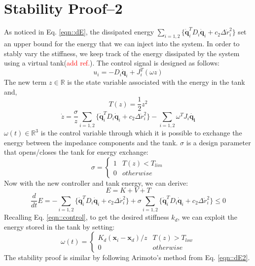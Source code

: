 \documentclass[]{article}
\begin{document}
\section{Stability Proof--2}
As noticed in Eq. \ref{eqn::dE}, the dissipated energy $\sum\limits_{i=1,2}\{\mathbf{\dot{q}}_i^TD_i\mathbf{\dot{q}}_i+c_2\Delta \dot{r}_i^2\}$ set an upper bound for the energy that we can inject into the system. In order to stably vary the stiffness, we keep track of the energy dissipated by the system using a virtual tank(\textcolor{red}{add ref.}). The control signal is designed as follows:
\begin{equation}
u_i=-D_i\mathbf{\dot{q}}_i+J_i^T(\omega z)
\label{eqn::new_control}
\end{equation} 
The new term $z\in \mathbb{R}$ is the state variable associated with the energy in the tank and,
\begin{equation}
T(z)=\frac{1}{2}z^2
\end{equation}
\begin{equation}
\dot{z}=\frac{\sigma}{z}\sum\limits_{i=1,2}\{\mathbf{\dot{q}}_i^TD_i\mathbf{\dot{q}}_i+c_2\Delta \dot{r}_i^2\}-\sum\limits_{i=1,2}\omega^T J_i\mathbf{\dot{q_i}}
\end{equation}
$\omega(t)\in \mathbb{R}^3$ is the control variable through which it is possible to exchange the energy between the impedance components and the tank. $\sigma$ is a design parameter that opens/closes the tank for energy exchange:
\begin{displaymath}
\sigma = \left\{\begin{array}{ll}
1& T(z)<T_{lim}\\
0& otherwise
\end{array}\right.
\end{displaymath}
Now with the new controller and tank energy, we can derive:
\begin{equation}
E=K+V+T
\end{equation}
\begin{equation}
\frac{d}{dt}E=-\sum\limits_{i=1,2}\{\mathbf{\dot{q}}_i^TD_i\mathbf{\dot{q}}_i+c_2\Delta \dot{r}_i^2\}+\sigma\sum\limits_{i=1,2}\{\mathbf{\dot{q}}_i^TD_i\mathbf{\dot{q}}_i+c_2\Delta \dot{r}_i^2\}\leq0
\label{eqn::dE2}
\end{equation}
Recalling Eq. \ref{eqn::control}, to get the desired stiffness $k_d$, we can exploit the energy stored in the tank by setting:
\begin{displaymath}
\omega(t)=\left\{\begin{array}{ll}
K_d(\mathbf{x}_i-\mathbf{x}_d)/z & T(z)>T_{low}\\
0&otherwise
\end{array}\right.
\end{displaymath}
The stability proof is similar by following Arimoto's method from Eq. \ref{eqn::dE2}.
\end{document}
